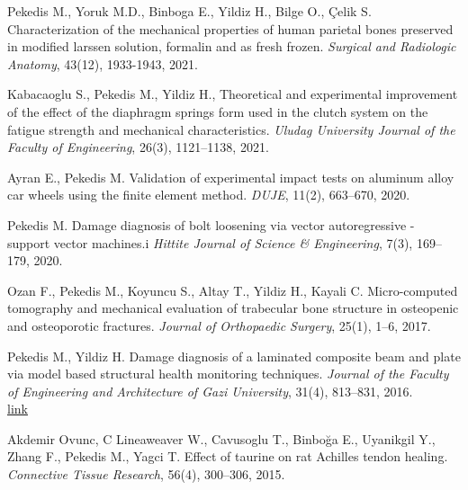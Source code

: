 \documentclass[10pt]{article}
\begin{document}
\begin{bibenum}
	\item Pekedis M., Yoruk M.D., Binboga E., Yildiz H., Bilge O., Çelik S. Characterization of the mechanical properties
		of human parietal bones preserved in modified larssen solution, formalin and as fresh frozen. 
		\emph{Surgical and Radiologic Anatomy}, 43(12), 1933-1943, 2021.
		
	\item Kabacaoglu S., Pekedis M., Yildiz H., Theoretical and experimental improvement of the effect of the diaphragm
		 springs form used in the clutch system on the fatigue strength and mechanical characteristics. 
		\emph{Uludag University Journal of the Faculty of Engineering}, 26(3), 1121--1138, 2021.
		
	\item Ayran E., Pekedis M. Validation of experimental impact tests on aluminum alloy car wheels using the 
		finite element method. 
		\emph{DUJE}, 11(2), 663--670, 2020.\\ 
	 	 
	\item Pekedis M. Damage diagnosis of bolt loosening via vector autoregressive - support vector machines.i
		\emph{Hittite Journal of Science & Engineering}, 7(3), 169--179, 2020.
		\\ 

	\item Ozan F., Pekedis M., Koyuncu S., Altay T., Yildiz H., Kayali C. Micro-computed tomography and mechanical
		evaluation of trabecular bone structure in osteopenic and osteoporotic fractures. 
		\emph{Journal of Orthopaedic Surgery}, 25(1), 1--6, 2017.
		
	\item Pekedis M., Yildiz H. Damage diagnosis of a laminated composite beam and plate via model based structural 
		health monitoring techniques. 
		\emph{Journal of the Faculty of Engineering and Architecture of Gazi University}, 31(4), 813--831, 2016.\\
		\href{https://dergipark.org.tr/en/download/article-file/259809} {link}
	
	\item Akdemir Ovunc, C Lineaweaver W., Cavusoglu T., Binboğa E., Uyanikgil Y., Zhang F., Pekedis M., Yagci T. Effect of taurine on rat Achilles tendon healing.
		 \emph{Connective Tissue Research}, 56(4), 300--306, 2015.\\ 
		 

\end{bibenum}
\end{document}
